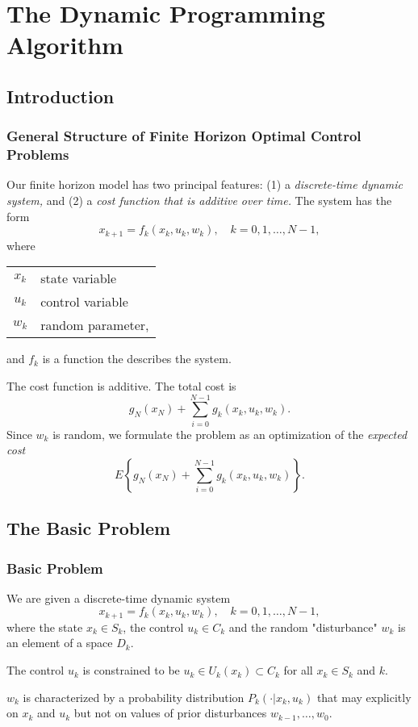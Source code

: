 \chapter{The Dynamic Programming Algorithm}
\section{Introduction}
\subsection{General Structure of Finite Horizon Optimal Control Problems}
Our finite horizon model has two principal features: (1) a \textit{discrete-time dynamic system,} and (2) a \textit{cost function that is additive over time.} The system has the form
$$x_{k+1}=f_k(x_k,u_k,w_k),\quad k=0,1,\dots,N-1,$$
where
\begin{center}
    \begin{tabular}{c|l}
    $x_k$ & state variable  \\
    $u_k$ & control variable\\
    $w_k$ & random parameter,
    \end{tabular}
\end{center}
and $f_k$ is a function the describes the system.

The cost function is additive. The total cost is 
$$g_N(x_N)+\sum_{i=0}^{N-1}g_k(x_k,u_k,w_k).$$
Since $w_k$ is random, we formulate the problem as an optimization of the \textit{expected cost}
$$E\left\{g_N(x_N)+\sum_{i=0}^{N-1}g_k(x_k,u_k,w_k)\right\}.$$

\section{The Basic Problem}
\subsection*{Basic Problem}
We are given a discrete-time dynamic system
$$x_{k+1}=f_k(x_k,u_k,w_k),\quad k=0,1,\dots,N-1,$$
where the state $x_k\in S_k$, the control $u_k\in C_k$ and the random "disturbance" $w_k$ is an element of a space $D_k$.

The control $u_k$ is constrained to be $u_k\in U_k(x_k)\subset C_k$ for all $x_k\in S_k$ and $k$.

$w_k$ is characterized by a probability distribution $P_k(\cdot|x_k,u_k)$ that may explicitly on $x_k$ and $u_k$ but not on values of prior disturbances $w_{k-1},\dots,w_0.$

